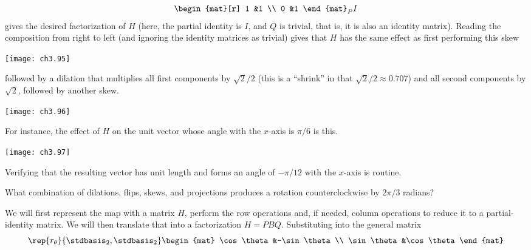 \begin{exercises}
\begin{answer}
\begin{exparts}
\begin{equation*}
{\begin{mat}[r]
                1  &1 \\
                0  &1
              \end{mat}
             }_P
            I
          \end{equation*}
          gives the desired factorization of $H$ (here, the partial
          identity is $I$, and $Q$ is trivial, that is, it is also an identity
          matrix).
        \partsitem Reading the composition from right to left (and ignoring the
          identity matrices as trivial) gives that $H$ has the same
          effect as first performing this skew 
          \begin{center}
            \texttt{[image: ch3.95]}
         \end{center}
         followed by a dilation that multiplies all first components by 
         $\sqrt{2}/2$ (this is a ``shrink'' in that $\sqrt{2}/2\approx0.707$) 
         and all second components by $\sqrt{2}$,
         followed by another skew. 
          \begin{center}
            \texttt{[image: ch3.96]}
         \end{center}
         For instance, the effect of $H$ on the unit vector whose angle with
         the $x$-axis is $\pi/6$ is this.
          \begin{center}
            \texttt{[image: ch3.97]}
         \end{center}
         Verifying that the resulting vector has unit length and forms an
         angle of $-\pi/12$ with the $x$-axis is routine. 
      \end{exparts}
    \end{answer}
  \item 
    What combination of dilations, flips, skews, and projections
    produces a rotation counterclockwise by $2\pi/3$ radians?
    \begin{answer}
      We will first represent the map with a matrix $H$,
      perform the row operations and, if needed, column operations
      to reduce it to a partial-identity matrix.
      We will then translate that into a factorization $H=PBQ$.
      Substituting into the general matrix
          \begin{equation*}
            \rep{r_\theta}{\stdbasis_2,\stdbasis_2}
            \begin{mat}
              \cos\theta  &-\sin\theta  \\
              \sin\theta  &\cos\theta
            \end{mat}
          \end{equation*}

\end{answer}
\end{exercises}
